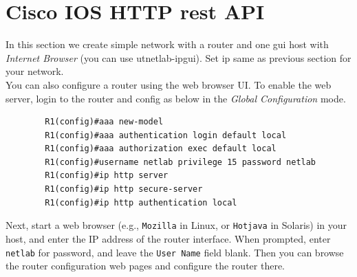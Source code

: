 \documentclass[10pt,a4paper]{article}
\numberwithin{equation}{section}
\numberwithin{figure}{section}
\numberwithin{table}{section}
\begin{document}
\section{Cisco IOS HTTP rest API}
    In this section we create simple network with a router and one gui host with \textit{Internet Browser} (you can use utnetlab-ipgui). Set ip same as previous section for your network.\\
    You can also configure a router using the web browser UI. To enable the web server, login to the router and config as below  in the \textit{Global Configuration} mode. \\
    \begin{verbatim}
        R1(config)#aaa new-model
        R1(config)#aaa authentication login default local
        R1(config)#aaa authorization exec default local
        R1(config)#username netlab privilege 15 password netlab
        R1(config)#ip http server
        R1(config)#ip http secure-server
        R1(config)#ip http authentication local
    \end{verbatim}
    Next, start a web browser (e.g., \texttt{Mozilla} in Linux, or \texttt{Hotjava} in Solaris) in your host, and enter the IP address of the router interface. When prompted, enter \texttt{netlab} for password, and leave the \texttt{User Name} field blank. Then you can browse the router configuration web pages and configure the router there.
\end{document}
